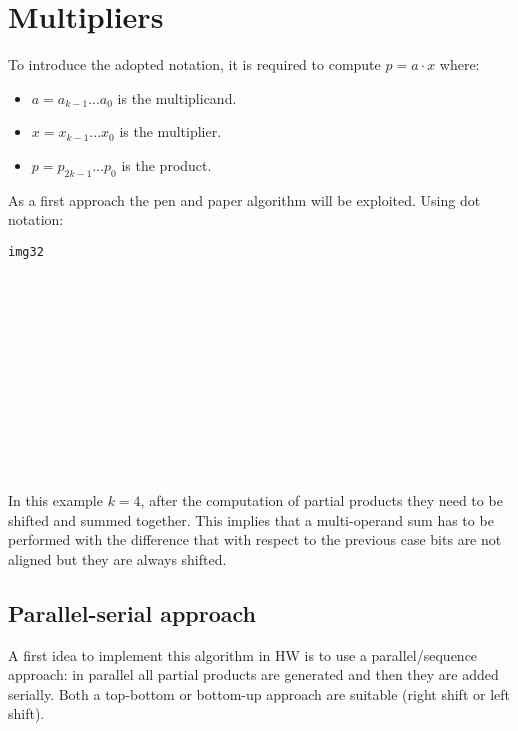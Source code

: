 \chapter{Multipliers}

To introduce the adopted notation, it is required to compute $p=a \cdot x$ where:
\begin{itemize}
  \item $a=a_{k-1}...a_0$ is the multiplicand.
  \item $x=x_{k-1}...x_0$ is the multiplier.
  \item $p=p_{2k-1}...p_0$ is the product.

\end{itemize}

As a first approach the pen and paper algorithm will be exploited. Using dot notation:
\begin{verbatim}
img32














\end{verbatim}

In this example $k=4$, after the computation of partial products they need to be shifted and summed together. This implies that a multi-operand sum has to be performed with the difference that with respect to the previous case bits are not aligned but they are always shifted.



\section{Parallel-serial approach}
A first idea to implement this algorithm in HW is to use a parallel/sequence approach: in parallel  all partial products are generated and then they are added serially. Both a top-bottom or bottom-up approach are suitable (right shift or left shift).


